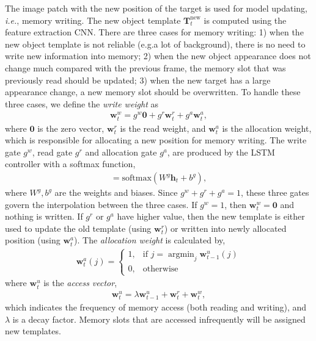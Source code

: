 \documentclass[runningheads]{llncs}
\begin{document}
The image patch with the new position of the target is used for model updating, \emph{i.e.}, memory writing.
The new object template $\mathbf{T}^{\text{new}}_t$ is computed using the feature extraction CNN. There are three cases for memory writing: 1) when the new object template is not reliable (e.g.\contains a lot of background), there is no need to write new information into memory; 2) when the new object appearance does not change much compared with the previous frame, the memory slot that was previously read should be updated; %
3) when the new target has a large appearance change, a new memory slot should be overwritten.
To handle these three cases, we define the \textit{write weight} as
\begin{align}
\mathbf{w}^w_t =g^w\mathbf{0}+g^r\mathbf{w}^r_t + g^a\mathbf{w}^a_t, 
\end{align}
where $\mathbf{0}$ is the zero vector, $\mathbf{w}^r_t$ is the read weight, and $\mathbf{w}^a_t$  is the allocation weight, which is responsible for allocating a new position for memory writing. 
The write gate $g^w$, read gate $g^r$ and allocation gate $g^a$, are produced by the LSTM controller with a softmax function, 
\begin{align}[g^w, g^r, g^a] = \text{softmax}(W^g \mathbf{h}_{t}+b^g),
\end{align}
where $W^g, b^g$ are the weights and biases. Since $g^w+g^r+g^a=1$, these three gates govern the interpolation between the three cases.  If $g^w=1$, then $\mathbf{w}^w_t=\mathbf{0}$ and nothing is written.  If $g^r$ or $g^a$ have higher value, then the new template is either used to update the old template (using $\mathbf{w}^r_t$) or written into newly allocated position (using $\mathbf{w}^a_t$). The \textit{allocation weight} is calculated by,
\begin{align}
\mathbf{w}^a_t(j)=
\begin{cases}
1, &\text{if } j=\displaystyle \mathop{\mathrm{argmin}}_{j} \mathbf{w}^u_{t-1}(j)\\
0, &\text{otherwise}
\end{cases}
\end{align}
where $\mathbf{w}^u_t$ is the \textit{access vector},
\begin{align}
\mathbf{w}^u_t = \lambda \mathbf{w}^u_{t-1} + \mathbf{w}^r_t + \mathbf{w}^w_t,
\end{align}
which indicates the frequency of memory access (both reading and writing), and $\lambda$ is a decay factor. Memory slots that are accessed infrequently will be assigned new templates.  
\end{document}
